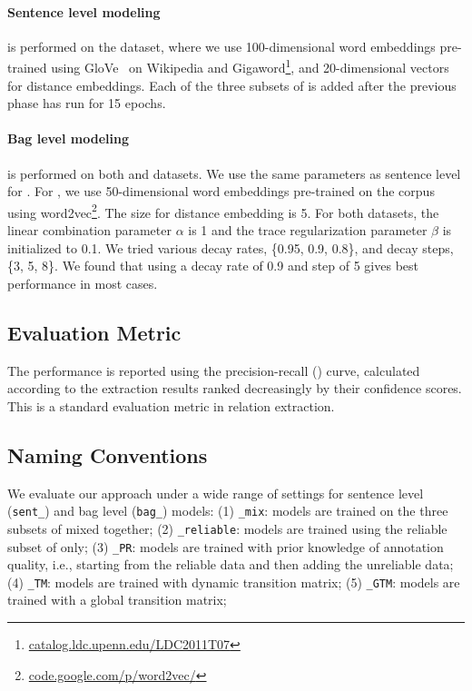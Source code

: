 \paragraph{Sentence level modeling}
 is performed on the \TimeRE dataset, where we use 100-dimensional word embeddings pre-trained using GloVe~\cite{pennington2014glove} on Wikipedia and Gigaword\footnote{\url{catalog.ldc.upenn.edu/LDC2011T07}}, and 20-dimensional vectors for distance embeddings. Each of the three subsets of \TimeRE is added after the previous phase has run for 15 epochs. 

\paragraph{Bag level modeling}
is performed on both  \TimeRE and  \EntityRE datasets. We use the same parameters as sentence level for \TimeRE.
For \EntityRE, we use 50-dimensional word embeddings pre-trained on the \NYT corpus using word2vec\footnote{\url{code.google.com/p/word2vec/}}. The size for distance embedding is 5. For both datasets, the linear combination parameter $\alpha$ is 1 and the trace regularization parameter $\beta$ is initialized to 0.1. We tried various decay rates, \{0.95, 0.9, 0.8\}, and decay steps, \{3, 5, 8\}. We found that using a decay rate of 0.9 and step of 5 gives best performance in most cases.

\subsection{Evaluation Metric}
The performance is reported using the precision-recall (\PR) curve, calculated according to the extraction results ranked decreasingly by their confidence scores. This is a standard evaluation metric in relation extraction.

\subsection{Naming Conventions}
We evaluate our approach under a wide range of settings for
 sentence level
(\texttt{sent\_}) and bag level (\texttt{bag\_}) models:
(1) \texttt{\_mix}: models are trained on the three subsets of \TimeRE mixed together;
(2) \texttt{\_reliable}: models are trained using the reliable subset of \TimeRE only;
(3) \texttt{\_PR}: models are trained with prior knowledge of annotation quality, i.e., starting from the reliable data and then adding the unreliable data;
(4) \texttt{\_TM}: models are trained with dynamic transition matrix;
(5) \texttt{\_GTM}: models are trained with a global transition matrix;

